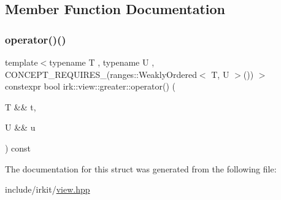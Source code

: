 \subsection{Member Function Documentation}
\mbox{\label{structirk_1_1view_1_1greater_aa40b3ea5907d02b3e70401c9b076284c}} 
\subsubsection{\texorpdfstring{operator()()}{operator()()}}
{\footnotesize\ttfamily template$<$typename T , typename U , C\+O\+N\+C\+E\+P\+T\+\_\+\+R\+E\+Q\+U\+I\+R\+E\+S\+\_\+(ranges\+::\+Weakly\+Ordered$<$ T, U $>$()) $>$ \\
constexpr bool irk\+::view\+::greater\+::operator() (\begin{DoxyParamCaption}\item[{T \&\&}]{t,  }\item[{U \&\&}]{u }\end{DoxyParamCaption}) const\hspace{0.3cm}{\ttfamily [inline]}}



The documentation for this struct was generated from the following file\+:\begin{DoxyCompactItemize}
\item 
include/irkit/\mbox{\hyperlink{view_8hpp}{view.\+hpp}}\end{DoxyCompactItemize}
